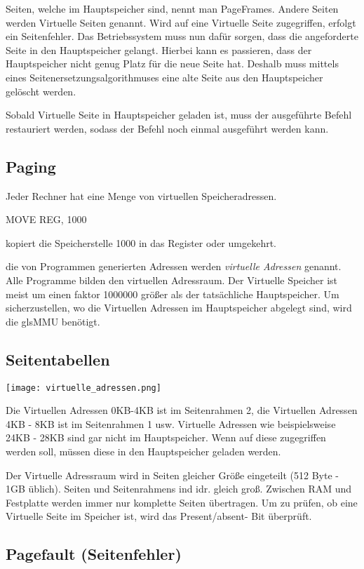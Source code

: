 Seiten, welche im Hauptspeicher sind, nennt man PageFrames. Andere Seiten werden Virtuelle Seiten genannt. Wird auf eine Virtuelle Seite zugegriffen, erfolgt ein Seitenfehler. Das Betriebssystem muss nun dafür sorgen, dass die angeforderte Seite in den Hauptspeicher gelangt. Hierbei kann es passieren, dass der Hauptspeicher nicht genug Platz für die neue Seite hat. Deshalb muss mittels eines Seitenersetzungsalgorithmuses eine alte Seite aus den Hauptspeicher gelöscht werden.

Sobald Virtuelle Seite in Hauptspeicher geladen ist, muss der ausgeführte Befehl restauriert werden, sodass der Befehl noch einmal ausgeführt werden kann.

\subsection{Paging}

Jeder Rechner hat eine Menge von virtuellen Speicheradressen. 

MOVE REG, 1000

kopiert die Speicherstelle 1000 in das Register oder umgekehrt.

die von Programmen generierten Adressen werden \textit{virtuelle Adressen} genannt. Alle Programme bilden den virtuellen Adressraum. Der Virtuelle Speicher ist meist um einen faktor 1000000 größer als der tatsächliche Hauptspeicher. Um sicherzustellen, wo die Virtuellen Adressen im Hauptspeicher abgelegt sind, wird die gls{MMU} benötigt.

\subsection{Seitentabellen}

\texttt{[image: virtuelle\_adressen.png]}

Die Virtuellen Adressen 0KB-4KB ist im Seitenrahmen 2, die Virtuellen Adressen 4KB - 8KB ist im Seitenrahmen 1 usw. Virtuelle Adressen wie beispielsweise 24KB - 28KB sind gar nicht im Hauptspeicher. Wenn auf diese zugegriffen werden soll, müssen diese in den Hauptspeicher geladen werden.

Der Virtuelle Adressraum wird in Seiten gleicher Größe eingeteilt (512 Byte - 1GB üblich). Seiten und Seitenrahmens ind idr. gleich groß. Zwischen RAM und Festplatte werden immer nur komplette Seiten übertragen. Um zu prüfen, ob eine Virtuelle Seite im Speicher ist, wird das Present/absent- Bit überprüft.

\subsection{Pagefault (Seitenfehler)}

